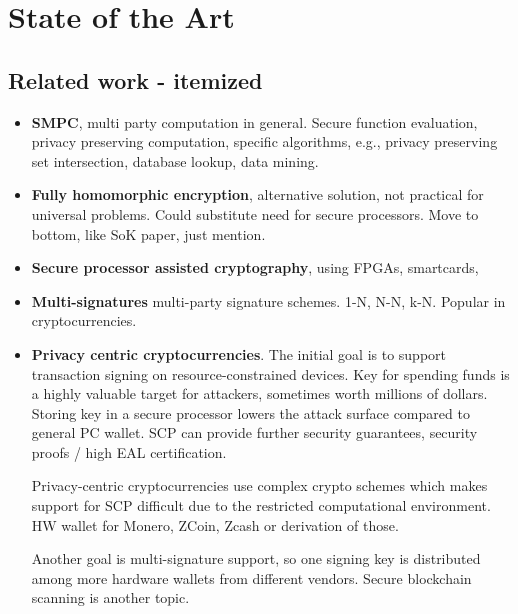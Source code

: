 \documentclass[
  digital, %
  twoside, %
  table,   %
  lof,     %
  lot,     %
]{fithesis3}
\newcounter{ph4_show_guides}
\theoremstyle{definition}
\theoremstyle{remark}
\begin{document}
\begin{ecmmnt}

\end{ecmmnt}

\chapter{State of the Art}\label{chapter:soa}%
\begin{ecmmnt}  %
\section{Related work - itemized}
\begin{itemize}
    \item {\bf{SMPC}}, multi party computation in general. Secure function evaluation, privacy preserving computation, specific algorithms, e.g., privacy preserving set intersection, database lookup, data mining. 
    
    \item {\bf{Fully homomorphic encryption}}, alternative solution, not practical for universal problems. Could substitute need for secure processors. Move to bottom, like SoK paper, just mention.
    
    \item {\bf{Secure processor assisted cryptography}}, using FPGAs, smartcards, 
    
    \item {\bf{Multi-signatures}} multi-party signature schemes. 1-N, N-N, k-N. Popular in cryptocurrencies.
    
    \item {\bf{Privacy centric cryptocurrencies}}. The initial goal is to support transaction signing on resource-constrained devices. Key for spending funds is a highly valuable target for attackers, sometimes worth millions of dollars. Storing key in a secure processor lowers the attack surface compared to general PC wallet. SCP can provide further security guarantees, security proofs / high EAL certification. 
    
    Privacy-centric cryptocurrencies use complex crypto schemes which makes support for SCP difficult due to the restricted computational environment. HW wallet for Monero, ZCoin, Zcash or derivation of those. 
    
    Another goal is multi-signature support, so one signing key is distributed among more hardware wallets from different vendors. Secure blockchain scanning is another topic. 
\end{itemize}


\end{ecmmnt}
\end{document}
